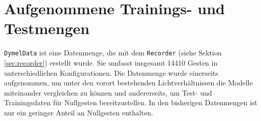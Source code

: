 \section{Aufgenommene Trainings- und Testmengen}
\label{sec:DymelData}
\texttt{DymelData} ist eine Datenmenge, die mit dem \texttt{Recorder} (siehe Sektion \ref{sec:recorder}) erstellt wurde. Sie umfasst insgesamt 14410 Gesten in unterschiedlichen Konfigurationen. Die Datenmenge wurde
einerseits aufgenommen, um unter den vorort bestehenden Lichtverhältnissen die Modelle miteinander vergleichen zu können und andererseits, um Test- und Trainingsdaten für Nullgesten bereitzustellen. In den
bisherigen Datenmengen ist nur ein geringer Anteil an Nullgesten enthalten.
\newline
\newline
{}
